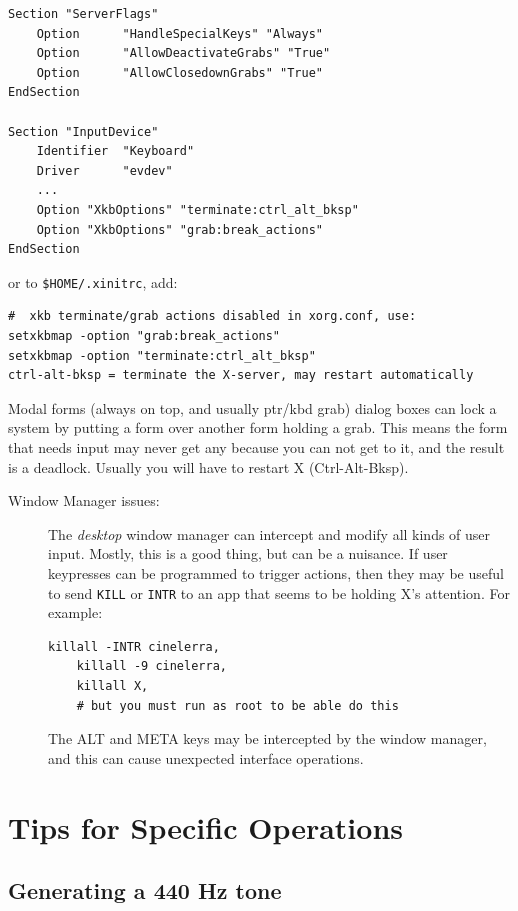 \begin{lstlisting}[numbers=none]
Section "ServerFlags"
	Option      "HandleSpecialKeys" "Always"
	Option      "AllowDeactivateGrabs" "True"
	Option      "AllowClosedownGrabs" "True"
EndSection

Section "InputDevice"
	Identifier  "Keyboard"
	Driver      "evdev"
	...
	Option "XkbOptions" "terminate:ctrl_alt_bksp"
	Option "XkbOptions" "grab:break_actions"
EndSection
\end{lstlisting}

or to \texttt{\$HOME/.xinitrc}, add:

\begin{lstlisting}[numbers=none]
#  xkb terminate/grab actions disabled in xorg.conf, use:	
setxkbmap -option "grab:break_actions"
setxkbmap -option "terminate:ctrl_alt_bksp"
ctrl-alt-bksp = terminate the X-server, may restart automatically
\end{lstlisting}


Modal forms (always on top, and usually ptr/kbd grab) dialog boxes can lock a system by putting a form over another form holding a grab.  This means the form that needs input may never get any because you can not get to it, and the result is a deadlock.  Usually you will have to restart X (Ctrl-Alt-Bksp).

\begin{description}
	\item[Window Manager issues:] The \textit{desktop} window manager can intercept and modify all kinds of user input.  Mostly, this is a good thing, but can be a nuisance.  If user keypresses can be programmed to trigger actions, then they may be useful to send \texttt{KILL} or \texttt{INTR} to an app that seems to be holding X's attention.  For example:
	\begin{lstlisting}[numbers=none]
	killall -INTR cinelerra,
	killall -9 cinelerra,	
	killall X,
	# but you must run as root to be able do this
	\end{lstlisting}
	The ALT and META keys may be intercepted by the window manager, and this can cause unexpected interface operations.
\end{description}

\section{Tips for Specific Operations}%
\label{sec:tips_specific_operations}

\subsection{Generating a 440 Hz tone}%
\label{sub:generating_440_tone}

